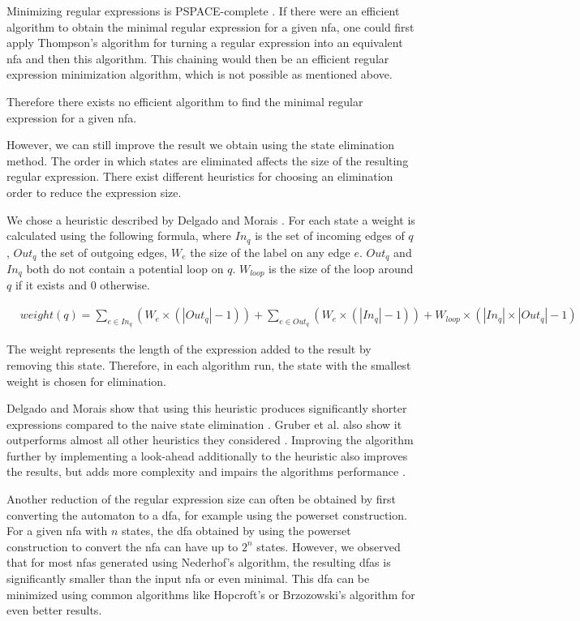 Minimizing regular expressions is PSPACE-complete \cite{minimizing_nfa}.
If there were an efficient algorithm to obtain the minimal regular expression for a given \ac{nfa}, one could first apply Thompson's algorithm\cite{thompson} for turning a regular expression into an equivalent \ac{nfa} and then this algorithm. This chaining would then be an efficient regular expression minimization algorithm, which is not possible as mentioned above.

Therefore there exists no efficient algorithm to find the minimal regular expression for a given \ac{nfa}.

However, we can still improve the result we obtain using the state elimination method.
The order in which states are eliminated affects the size of the resulting regular expression. There exist different heuristics for choosing an elimination order to reduce the expression size.

We chose a heuristic described by Delgado and Morais \cite{delgado}.
For each state a weight is calculated using the following formula, where $In_q$ is the set of incoming edges of $q$, $Out_q$ the set of outgoing edges, $W_e$ the size of the label on any edge $e$. $Out_q$ and $In_q$ both do not contain a potential loop on $q$. $W_{loop}$ is the size of the loop around $q$ if it exists and $0$ otherwise. 

\begin{align*}
	&weight(q) = \sum_{e \in In_q} (W_{e} \times (|Out_q| - 1)) + \sum_{e \in Out_q} (W_{e} \times (|In_q| - 1)) + W_{loop} \times (|In_q| \times |Out_q| - 1)
\end{align*}

The weight represents the length of the expression added to the result by removing this state.
Therefore, in each algorithm run, the state with the smallest weight is chosen for elimination.

Delgado and Morais show that using this heuristic produces significantly shorter expressions compared to the naive state elimination \cite{delgado}. Gruber et al. also show it outperforms almost all other heuristics they considered \cite{gruber}.
Improving the algorithm further by implementing a look-ahead additionally to the heuristic also improves the results, but adds more complexity and impairs the algorithms performance \cite{delgado}.

Another reduction of the regular expression size can often be obtained by first converting the automaton to a \ac{dfa}, for example using the powerset construction. For a given \ac{nfa} with $n$ states, the \ac{dfa} obtained by using the powerset construction to convert the \ac{nfa} can have up to $2^n$ states. However, we observed that for most \acp{nfa} generated using Nederhof's algorithm, the resulting \acp{dfa} is significantly smaller than the input \ac{nfa} or even minimal. This \ac{dfa} can be minimized using common algorithms like Hopcroft's or Brzozowski's algorithm for even better results.

